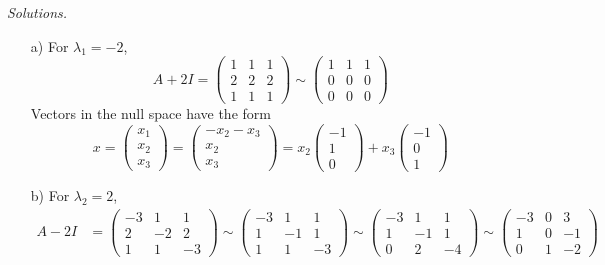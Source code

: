     \ifnum {} {\color{DarkBlue} \textit{Solutions.} 
    \begin{enumerate}
        \item[a)] For $\lambda_1 = -2$, 
        $$A + 2I = \begin{pmatrix} 1&1&1\\2&2&2\\1&1&1\end{pmatrix}\sim\begin{pmatrix} 1&1&1\\0&0&0\\0&0&0\end{pmatrix}$$ Vectors in the null space have the form $$x = \begin{pmatrix}x_1\\x_2\\x_3 \end{pmatrix} = \begin{pmatrix}-x_2-x_3\\x_2\\x_3 \end{pmatrix} = x_2\begin{pmatrix} -1\\1\\0\end{pmatrix} + x_3 \begin{pmatrix} -1\\0\\1\end{pmatrix}$$ 
        \item[b)] For $\lambda_2 = 2$, 
        \begin{align*}
            A - 2 I 
        &= \begin{pmatrix} -3&1&1\\2&-2&2\\1&1&-3\end{pmatrix}
        \sim\begin{pmatrix} -3&1&1\\1&-1&1\\1&1&-3\end{pmatrix}
        \sim\begin{pmatrix} -3&1&1\\1&-1&1\\0&2&-4\end{pmatrix}
        \sim\begin{pmatrix} -3&0&3\\1&0&-1\\0&1&-2\end{pmatrix} 
        \end{align*}

\end{enumerate}}
